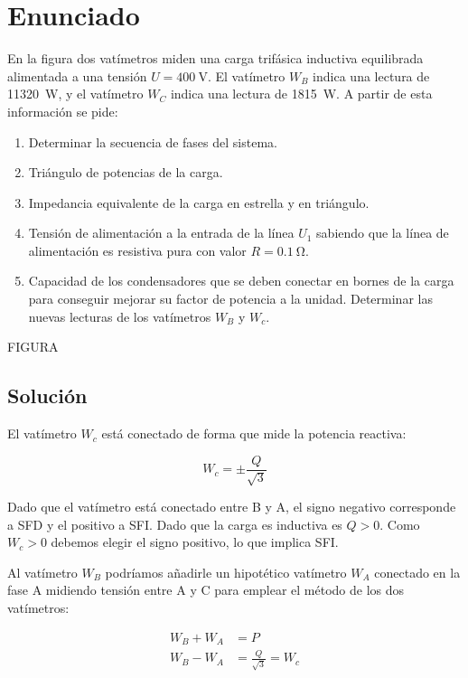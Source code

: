 \section{Enunciado}

En la figura dos vatímetros miden una carga trifásica inductiva
equilibrada alimentada a una tensión $U = \SI{400}{\volt}$. El
vatímetro $W_B$ indica una lectura de \SI{11320}{\watt}, y el
vatímetro $W_C$ indica una lectura de \SI{1815}{\watt}. A partir de
esta información se pide:

\begin{enumerate}
\item Determinar la secuencia de fases del sistema.
\item Triángulo de potencias de la carga.
\item Impedancia equivalente de la carga en estrella y
  en triángulo.
\item Tensión de alimentación a la entrada de la línea
  $U_1$ sabiendo que la línea de alimentación es resistiva pura con
  valor $R = \SI{0.1}{\ohm}$.
\item Capacidad de los condensadores que se deben
  conectar en bornes de la carga para conseguir mejorar su factor de
  potencia a la unidad. Determinar las nuevas lecturas de los
  vatímetros $W_B$ y $W_c$.
\end{enumerate}

\begin{center}
  FIGURA
\end{center}

\subsection*{Solución}

El vatímetro $W_c$ está conectado de forma que mide la potencia
reactiva:

\[
  W_c = \pm \frac{Q}{\sqrt{3}}
\]

Dado que el vatímetro está conectado entre B y A, el signo negativo
corresponde a SFD y el positivo a SFI. Dado que la carga es inductiva
es $Q > 0$. Como $W_c > 0$ debemos elegir el signo positivo, lo que
implica SFI.

Al vatímetro $W_B$ podríamos añadirle un hipotético vatímetro
$W_A$ conectado en la fase A midiendo tensión entre A y C para
emplear el método de los dos vatímetros:


\begin{align*}
W_B + W_A &= P\\
W_B - W_A &= \frac{Q}{\sqrt{3}} = W_c
\end{align*}

